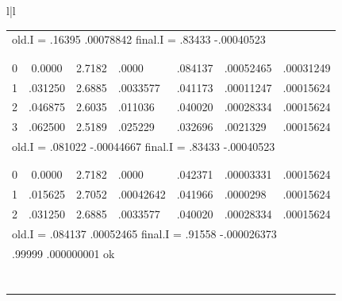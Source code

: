 \begin{figure}[H]
\begin{tabular}{l|l}
\begin{tabular}{cccllll}
            \multicolumn{7}{l}{old.I = .16395 .00078842 \hfill final.I = .83433 -.00040523} \\
        \\
            \Agrandheader \\
            0 & 0.0000  & 2.7182 & .0000    & .084137 & .00052465 & .00031249 \\
            1 & .031250 & 2.6885 & .0033577 & .041173 & .00011247 & .00015624 \\
            2 & .046875 & 2.6035 & .011036  & .040020 & .00028334 & .00015624 \\
            3 & .062500 & 2.5189 & .025229  & .032696 & .0021329  & .00015624 \\
            \multicolumn{7}{l}{old.I = .081022 -.00044667 \hfill final.I = .83433 -.00040523} \\
        \\
            \Agrandheader \\
            0 & 0.0000  & 2.7182 & .0000     & .042371 & .00003331 & .00015624 \\
            1 & .015625 & 2.7052 & .00042642 & .041966 & .0000298  & .00015624 \\
            2 & .031250 & 2.6885 & .0033577  & .040020 & .00028334 & .00015624 \\
            \multicolumn{7}{l}{old.I = .084137 .00052465 \hfill final.I = .91558 -.000026373} \\
            \multicolumn{7}{l}{\tikzmarked{target}.99999 .000000001 ok}
            \\ \\ \\ \\ \\ \\ \\ \\
        \end{tabular}
    \end{tabular}
    
    
\end{figure}